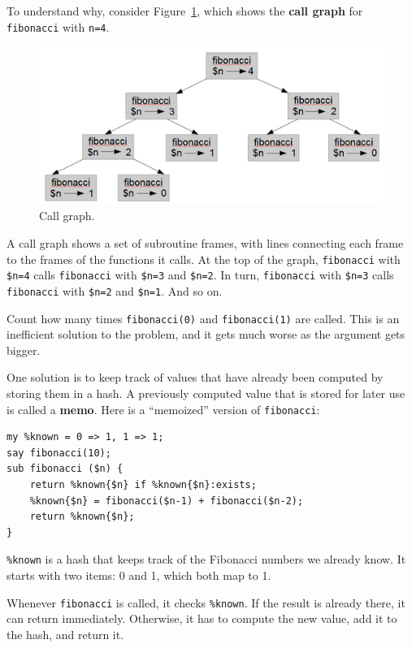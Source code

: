 To understand why, consider Figure~\ref{fig.fibonacci}, which shows
the {\bf call graph} for {\tt fibonacci} with {\tt n=4}.

\begin{figure}
\centerline
{\includegraphics[scale=0.7]{figs/fibonacci.png}}
\caption{Call graph.}
\label{fig.fibonacci}
\end{figure}

A call graph shows a set of subroutine frames, with lines 
connecting each frame to the frames of the functions it 
calls.  At the top of the graph, {\tt fibonacci} with 
\verb'$n=4' calls {\tt fibonacci} with \verb'$n=3' and 
\verb'$n=2'.  In turn, {\tt fibonacci} with \verb'$n=3' calls
{\tt fibonacci} with \verb'$n=2' and \verb'$n=1'.  And so on.

Count how many times {\tt fibonacci(0)} and {\tt fibonacci(1)} 
are called.  This is an inefficient solution to the problem, 
and it gets much worse as the argument gets bigger.

One solution is to keep track of values that have already been
computed by storing them in a hash.  A previously computed value
that is stored for later use is called a {\bf memo}.  Here is a
``memoized'' version of {\tt fibonacci}:

\begin{verbatim}
my %known = 0 => 1, 1 => 1;
say fibonacci(10);
sub fibonacci ($n) {
    return %known{$n} if %known{$n}:exists;
    %known{$n} = fibonacci($n-1) + fibonacci($n-2);
    return %known{$n};
}
\end{verbatim}
%

\verb'%known' is a hash that keeps track of the Fibonacci
numbers we already know.  It starts with
two items: 0 and 1, which both map to 1.

Whenever {\tt fibonacci} is called, it checks \verb'%known'.
If the result is already there, it can return
immediately.  Otherwise, it has to 
compute the new value, add it to the hash, and return it.

